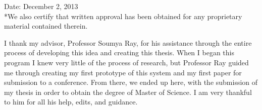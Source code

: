 \noindent
Date: December 2, 2013\\

\noindent
*We also certify that written approval has been obtained for any
proprietary material contained therein.

\copyrightpage

\begin{acknowledgments}
I thank my advisor, Professor Soumya Ray, for his assistance through the entire process of
developing this idea and creating this thesis.  When I began this program I knew very
little of the process of research, but Professor Ray guided me through creating my first
prototype of this system and my first paper for submission to a conference.  From there,
we ended up here, with the submission of my thesis in order to obtain the degree of
Master of Science.  I am very thankful to him for all his help, edits, and guidance.
\end{acknowledgments}

\tableofcontents
\listoffigures

\begin{umiabstract}
  
\end{umiabstract}


\clearpage{} %
